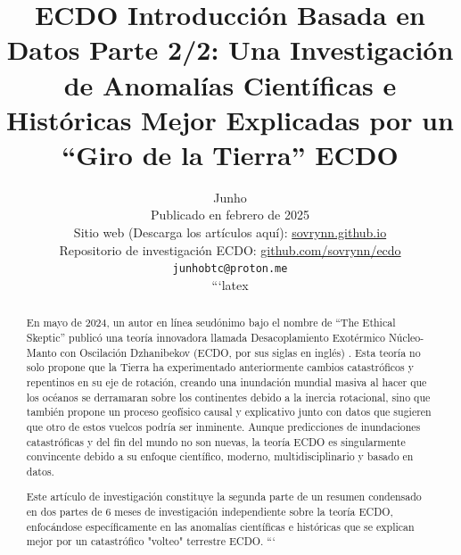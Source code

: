 \documentclass[10pt,twocolumn,letterpaper]{article}
\begin{document}
\title{ECDO Introducción Basada en Datos Parte 2/2: Una Investigación de Anomalías Científicas e Históricas Mejor Explicadas por un “Giro de la Tierra” ECDO}

\author{Junho\\
Publicado en febrero de 2025\\
Sitio web (Descarga los artículos aquí): \href{https://sovrynn.github.io}{sovrynn.github.io}\\
Repositorio de investigación ECDO: \href{https://github.com/sovrynn/ecdo}{github.com/sovrynn/ecdo}\\
{\tt\small junhobtc@proton.me}

```latex
}

\maketitle

\begin{abstract}
En mayo de 2024, un autor en línea seudónimo bajo el nombre de “The Ethical Skeptic” \cite{0} publicó una teoría innovadora llamada Desacoplamiento Exotérmico Núcleo-Manto con Oscilación Dzhanibekov (ECDO, por sus siglas en inglés) \cite{1}. Esta teoría no solo propone que la Tierra ha experimentado anteriormente cambios catastróficos y repentinos en su eje de rotación, creando una inundación mundial masiva al hacer que los océanos se derramaran sobre los continentes debido a la inercia rotacional, sino que también propone un proceso geofísico causal y explicativo junto con datos que sugieren que otro de estos vuelcos podría ser inminente. Aunque predicciones de inundaciones catastróficas y del fin del mundo no son nuevas, la teoría ECDO es singularmente convincente debido a su enfoque científico, moderno, multidisciplinario y basado en datos.

Este artículo de investigación constituye la segunda parte de un resumen condensado en dos partes de 6 meses de investigación independiente \cite{2,20} sobre la teoría ECDO, enfocándose específicamente en las anomalías científicas e históricas que se explican mejor por un catastrófico "volteo" terrestre ECDO.
```
\end{abstract}
\end{document}
